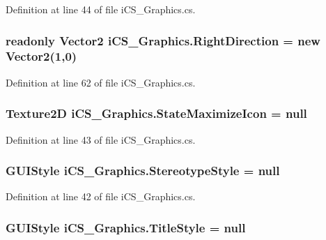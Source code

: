 Definition at line 44 of file i\+C\+S\+\_\+\+Graphics.\+cs.

\hypertarget{classi_c_s___graphics_a24769daf0c5bac506b7bd4d98dcf3a6e}{
\subsubsection[{Right\+Direction}]{\setlength{\rightskip}{0pt plus 5cm}readonly Vector2 i\+C\+S\+\_\+\+Graphics.\+Right\+Direction = new Vector2(1,0)\hspace{0.3cm}{\ttfamily [static]}}}\label{classi_c_s___graphics_a24769daf0c5bac506b7bd4d98dcf3a6e}


Definition at line 62 of file i\+C\+S\+\_\+\+Graphics.\+cs.

\hypertarget{classi_c_s___graphics_ae60d573201fa8574756940d6959da30b}{
\subsubsection[{State\+Maximize\+Icon}]{\setlength{\rightskip}{0pt plus 5cm}Texture2\+D i\+C\+S\+\_\+\+Graphics.\+State\+Maximize\+Icon = null}}\label{classi_c_s___graphics_ae60d573201fa8574756940d6959da30b}


Definition at line 43 of file i\+C\+S\+\_\+\+Graphics.\+cs.

\hypertarget{classi_c_s___graphics_acc14f405c69cf4a4fa4fd13274abb19b}{
\subsubsection[{Stereotype\+Style}]{\setlength{\rightskip}{0pt plus 5cm}G\+U\+I\+Style i\+C\+S\+\_\+\+Graphics.\+Stereotype\+Style = null}}\label{classi_c_s___graphics_acc14f405c69cf4a4fa4fd13274abb19b}


Definition at line 42 of file i\+C\+S\+\_\+\+Graphics.\+cs.

\hypertarget{classi_c_s___graphics_aa469f9e3a6dc60b0b0045576a4d073db}{
\subsubsection[{Title\+Style}]{\setlength{\rightskip}{0pt plus 5cm}G\+U\+I\+Style i\+C\+S\+\_\+\+Graphics.\+Title\+Style = null}}\label{classi_c_s___graphics_aa469f9e3a6dc60b0b0045576a4d073db}


